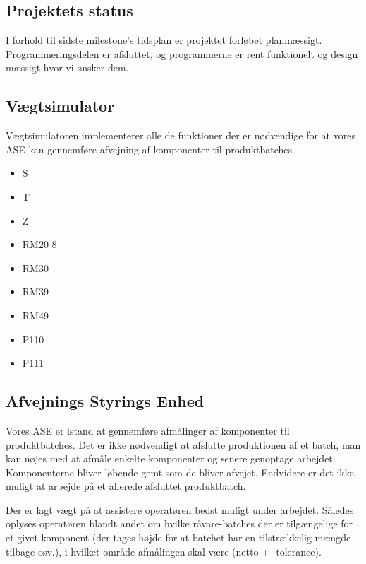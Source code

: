\documentclass[a4paper]{article}
\begin{document}
\subsection{Projektets status} %

I forhold til sidste milestone's tidsplan er projektet forløbet planmæssigt. Programmeringsdelen er afsluttet, og programmerne er rent funktionelt og design mæssigt hvor vi ønsker dem.


\subsection{Vægtsimulator} %

Vægtsimulatoren implementerer alle de funktioner der er nødvendige for at vores ASE kan gennemføre afvejning af komponenter til produktbatches.
\begin{itemize}
  \item S
  \item T
  \item Z
  \item RM20 8
  \item RM30
  \item RM39
  \item RM49
  \item P110
  \item P111
\end{itemize}


\subsection{Afvejnings Styrings Enhed} %
\label{sub:Afvejnings Styrings Enhed}

Vores ASE er istand at gennemføre afmålinger af komponenter til produktbatches. Det er ikke nødvendigt at afslutte produktionen af et batch, man kan nøjes med at afmåle enkelte komponenter og senere genoptage arbejdet. Komponenterne bliver løbende gemt som de bliver afvejet. Endvidere er det ikke muligt at arbejde på et allerede afsluttet produktbatch.

Der er lagt vægt på at assistere operatøren bedst muligt under arbejdet. Således oplyses operatøren blandt andet om hvilke råvare-batches der er tilgængelige for et givet komponent (der tages højde for at batchet har en tilstrækkelig mængde tilbage osv.), i hvilket område afmålingen skal være (netto +- tolerance).
\end{document}
